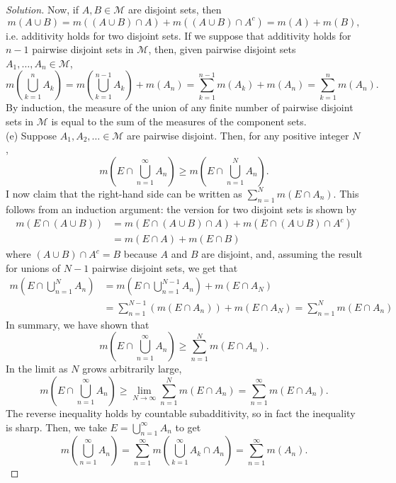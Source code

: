 \documentclass[10pt]{article}
\newenvironment{soln}{\begin{proof}[Solution]}{\end{proof}}
\begin{document}
\begin{soln}
    Now, if $A,B\in\mathcal M$ are disjoint sets, then
    \begin{equation*}
	m(A\cup B) = m((A\cup B)\cap A) + m((A\cup B)\cap A^c)
	= m(A) + m(B),
    \end{equation*}
    i.e. additivity holds for two disjoint sets.
    If we suppose that additivity holds for $n-1$ pairwise disjoint
    sets in $\mathcal M$, then, given pairwise disjoint sets
    $A_1,\dots,A_n\in\mathcal M$,
    \begin{equation*}
	m\left(\bigcup_{k=1}^n A_k\right)
	= m\left(\bigcup_{k=1}^{n-1} A_k\right) + m(A_n)
	= \sum_{k=1}^{n-1}m(A_k) + m(A_n)
	= \sum_{k=1}^n m(A_n).
    \end{equation*}
    By induction, the measure of the union of any finite number of
    pairwise disjoint sets in $\mathcal M$
    is equal to the sum of the measures of the component sets.
    \\

    (e) Suppose $A_1,A_2,\ldots\in\mathcal M$ are pairwise disjoint.
    Then, for any positive integer $N$,
    \begin{equation*}
	m\left(E\cap\bigcup_{n=1}^\infty A_n\right) \ge
	m\left(E\cap\bigcup_{n=1}^N A_n\right).
    \end{equation*}
    I now claim that the right-hand side can be written as
    $\sum_{n=1}^N m(E\cap A_n)$.
    This follows from an induction argument:
    the version for two disjoint sets is shown by
    \begin{align*}
	m(E\cap(A\cup B)) &=
	m(E\cap(A\cup B)\cap A) + m(E\cap(A\cup B)\cap A^c)\\
			  &= m(E\cap A) + m(E\cap B)
    \end{align*}
    where $(A\cup B)\cap A^c = B$ because $A$ and $B$ are disjoint,
    and, assuming the result for unions of $N-1$ pairwise disjoint sets,
    we get that
    \begin{align*}
	m\left(E\cap\bigcup_{n=1}^N A_n\right)
	&= m\left(E\cap\bigcup_{n=1}^{N-1} A_n\right) + m(E\cap A_N)\\
	&= \sum_{n=1}^{N-1} (m(E\cap A_n)) + m(E\cap A_N)
	= \sum_{n=1}^N m(E\cap A_n)
    \end{align*}
    In summary, we have shown that
    \begin{equation*}
	m\left(E\cap\bigcup_{n=1}^\infty A_n\right) \ge
	\sum_{n=1}^N m(E\cap A_n).
    \end{equation*}
    In the limit as $N$ grows arbitrarily large,
    \begin{equation*}
	m\left(E\cap\bigcup_{n=1}^\infty A_n\right) \ge
	\lim_{N\to\infty}\sum_{n=1}^N m(E\cap A_n)
	= \sum_{n=1}^\infty m(E\cap A_n).
    \end{equation*}
    The reverse inequality holds by countable subadditivity,
    so in fact the inequality is sharp.
    Then, we take $E = \bigcup_{n=1}^\infty A_n$ to get
    \begin{equation*}
	m\left(\bigcup_{n=1}^\infty A_n\right) =
	\sum_{n=1}^\infty m\left(\bigcup_{k=1}^\infty A_k\cap A_n\right) =
	\sum_{n=1}^\infty m(A_n).
    \end{equation*}


\end{soln}
\end{document}
